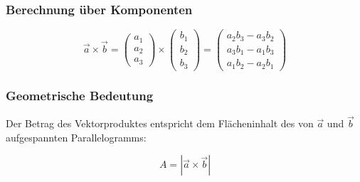 \subsubsection{Berechnung über Komponenten}
\[
     \vec a \times \vec b =
     \begin{pmatrix}
          a_1 \\
          a_2 \\
          a_3
     \end{pmatrix} \times
     \begin{pmatrix}
          b_1 \\
          b_2 \\
          b_3
     \end{pmatrix}
     =
     \begin{pmatrix}
          a_2b_3-a_3b_2 \\
          a_3b_1-a_1b_3 \\
          a_1b_2-a_2b_1
     \end{pmatrix}
\]

\subsubsection{Geometrische Bedeutung}

Der Betrag des Vektorproduktes entspricht dem Flächeninhalt des von $\vec a$ und $\vec b$ aufgespannten Parallelogramms:

\[
     A = |\vec a \times \vec b|
\]

